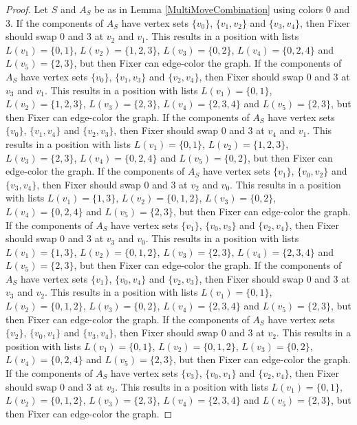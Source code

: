 \documentclass[12pt]{amsart}
\theoremstyle{plain}
\theoremstyle{definition}
\theoremstyle{remark}
\begin{document}
\begin{proof}
Let $S$ and $A_S$ be as in Lemma \ref{MultiMoveCombination} using colors $0$ and $3$. If the components of $A_S$ have vertex sets $\{v_0\}$, $\{v_1, v_2\}$ and $\{v_3, v_4\}$, then Fixer should swap 0 and 3 at $v_2$ and $v_1$. This results in a position with lists $L(v_1) = \{0, 1\}$, $L(v_2) = \{1, 2, 3\}$, $L(v_3) = \{0, 2\}$, $L(v_4) = \{0, 2, 4\}$ and $L(v_5) = \{2, 3\}$, but then Fixer can edge-color the graph.
If the components of $A_S$ have vertex sets $\{v_0\}$, $\{v_1, v_3\}$ and $\{v_2, v_4\}$, then Fixer should swap 0 and 3 at $v_3$ and $v_1$. This results in a position with lists $L(v_1) = \{0, 1\}$, $L(v_2) = \{1, 2, 3\}$, $L(v_3) = \{2, 3\}$, $L(v_4) = \{2, 3, 4\}$ and $L(v_5) = \{2, 3\}$, but then Fixer can edge-color the graph.
If the components of $A_S$ have vertex sets $\{v_0\}$, $\{v_1, v_4\}$ and $\{v_2, v_3\}$, then Fixer should swap 0 and 3 at $v_4$ and $v_1$. This results in a position with lists $L(v_1) = \{0, 1\}$, $L(v_2) = \{1, 2, 3\}$, $L(v_3) = \{2, 3\}$, $L(v_4) = \{0, 2, 4\}$ and $L(v_5) = \{0, 2\}$, but then Fixer can edge-color the graph.
If the components of $A_S$ have vertex sets $\{v_1\}$, $\{v_0, v_2\}$ and $\{v_3, v_4\}$, then Fixer should swap 0 and 3 at $v_2$ and $v_0$. This results in a position with lists $L(v_1) = \{1, 3\}$, $L(v_2) = \{0, 1, 2\}$, $L(v_3) = \{0, 2\}$, $L(v_4) = \{0, 2, 4\}$ and $L(v_5) = \{2, 3\}$, but then Fixer can edge-color the graph.
If the components of $A_S$ have vertex sets $\{v_1\}$, $\{v_0, v_3\}$ and $\{v_2, v_4\}$, then Fixer should swap 0 and 3 at $v_3$ and $v_0$. This results in a position with lists $L(v_1) = \{1, 3\}$, $L(v_2) = \{0, 1, 2\}$, $L(v_3) = \{2, 3\}$, $L(v_4) = \{2, 3, 4\}$ and $L(v_5) = \{2, 3\}$, but then Fixer can edge-color the graph.
If the components of $A_S$ have vertex sets $\{v_1\}$, $\{v_0, v_4\}$ and $\{v_2, v_3\}$, then Fixer should swap 0 and 3 at $v_3$ and $v_2$. This results in a position with lists $L(v_1) = \{0, 1\}$, $L(v_2) = \{0, 1, 2\}$, $L(v_3) = \{0, 2\}$, $L(v_4) = \{2, 3, 4\}$ and $L(v_5) = \{2, 3\}$, but then Fixer can edge-color the graph.
If the components of $A_S$ have vertex sets $\{v_2\}$, $\{v_0, v_1\}$ and $\{v_3, v_4\}$, then Fixer should swap 0 and 3 at $v_2$. This results in a position with lists $L(v_1) = \{0, 1\}$, $L(v_2) = \{0, 1, 2\}$, $L(v_3) = \{0, 2\}$, $L(v_4) = \{0, 2, 4\}$ and $L(v_5) = \{2, 3\}$, but then Fixer can edge-color the graph.
If the components of $A_S$ have vertex sets $\{v_3\}$, $\{v_0, v_1\}$ and $\{v_2, v_4\}$, then Fixer should swap 0 and 3 at $v_3$. This results in a position with lists $L(v_1) = \{0, 1\}$, $L(v_2) = \{0, 1, 2\}$, $L(v_3) = \{2, 3\}$, $L(v_4) = \{2, 3, 4\}$ and $L(v_5) = \{2, 3\}$, but then Fixer can edge-color the graph.

\end{proof}
\end{document}

